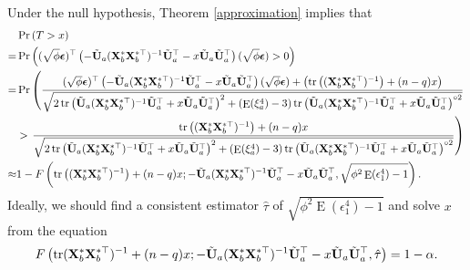 \documentclass[11pt]{article}
\DeclareMathOperator{\mytr}{tr}
\DeclareMathOperator{\myE}{E}
\theoremstyle{plain}
\theoremstyle{definition}
\theoremstyle{remark}
\begin{document}
Under the null hypothesis, Theorem \ref{approximation} implies that
\begin{equation*}
    \begin{split}
    &\Pr\left( 
        T> x 
    \right) 
    \\
    =&
    \Pr\left( 
        (\sqrt \phi \bepsilon)^\top 
        \left( 
        -\tilde{\BU}_a ( \BX_b^* \BX_b^{*\top} )^{-1} \tilde{\BU}_a^\top 
   -x\tilde{\BU}_a \tilde{\BU}_a^\top
        \right)
        (\sqrt \phi \bepsilon)
        > 0
    \right) 
    \\
    =&
    \Pr\left( 
        \frac{
        (\sqrt \phi \bepsilon)^\top 
        \left( 
        -\tilde{\BU}_a ( \BX_b^* \BX_b^{*\top} )^{-1} \tilde{\BU}_a^\top 
   -x\tilde{\BU}_a \tilde{\BU}_a^\top
        \right)
        (\sqrt \phi \bepsilon)
   +
   \left( 
   \mytr\left( (\BX_b^* \BX_b^{*\top})^{-1} \right)
   +(n-q)x
   \right)
   }{
       \sqrt{
           2\mytr\left( 
        \tilde{\BU}_a ( \BX_b^* \BX_b^{*\top} )^{-1} \tilde{\BU}_a^\top 
   +x\tilde{\BU}_a \tilde{\BU}_a^\top
   \right)^2
   +\left( \myE (\xi_a^4) -3 \right)
\mytr\left( 
        \tilde{\BU}_a ( \BX_b^* \BX_b^{*\top} )^{-1} \tilde{\BU}_a^\top 
   +x\tilde{\BU}_a \tilde{\BU}_a^\top
   \right)^{\circ 2}
   }
   }
   \right.
   \\
        &> 
        \left.
        \frac{
   \mytr\left( (\BX_b^* \BX_b^{*\top})^{-1} \right)
   +(n-q)x
   }{
       \sqrt{
           2\mytr\left( 
        \tilde{\BU}_a ( \BX_b^* \BX_b^{*\top} )^{-1} \tilde{\BU}_a^\top 
   +x\tilde{\BU}_a \tilde{\BU}_a^\top
   \right)^2
   +\left( \myE (\xi_a^4) -3 \right)
\mytr\left( 
        \tilde{\BU}_a ( \BX_b^* \BX_b^{*\top} )^{-1} \tilde{\BU}_a^\top 
   +x\tilde{\BU}_a \tilde{\BU}_a^\top
   \right)^{\circ 2}
   }
   }
    \right) 
    \\
    \approx& 
    1- F\left(
   \mytr\left( (\BX_b^* \BX_b^{*\top})^{-1} \right)
   +(n-q)x
        ;-\tilde{\BU}_a ( \BX_b^* \BX_b^{*\top} )^{-1} \tilde{\BU}_a^\top 
   -x\tilde{\BU}_a \tilde{\BU}_a^\top
,\sqrt{\phi^2 \myE (\epsilon_1^4) -1}\right)
.
    \end{split}
\end{equation*}
Ideally, we should find a consistent estimator $\hat \tau$ of $\sqrt{\phi^2 \myE (\epsilon_1^4) -1}$ and solve $x$ from the equation
\begin{equation*}
     F\left(
   \mytr (\BX_b^* \BX_b^{*\top})^{-1} 
   +(n-q)x
        ;-\tilde{\BU}_a ( \BX_b^* \BX_b^{*\top} )^{-1} \tilde{\BU}_a^\top 
   -x\tilde{\BU}_a \tilde{\BU}_a^\top
,\hat \tau\right)
=1-\alpha.
\end{equation*}
\end{document}
